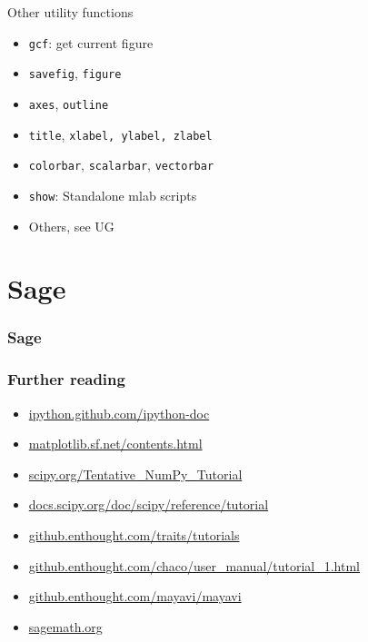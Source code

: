 \documentclass[14pt,compress]{beamer}
\newcounter{time}
\newcommand{\inctime}[1]{\addtocounter{time}{#1}{\tiny \thetime\ m}}
\newcommand{\PythonCode}[1]{\lstinline{#1}}
\begin{document}
\begin{frame}[plain]
    {Other utility functions}
    \begin{itemize}
        \item \PythonCode{gcf}: get current figure
            \pause
        \item \PythonCode{savefig}, \PythonCode{figure}
            \pause
        \item \PythonCode{axes}, \PythonCode{outline}
            \pause
        \item \PythonCode{title}, \PythonCode{xlabel, ylabel, zlabel}
            \pause
        \item \PythonCode{colorbar}, \PythonCode{scalarbar},
            \PythonCode{vectorbar}
            \pause
        \item \PythonCode{show}: Standalone mlab scripts
            \pause
        \item Others, see UG
    \end{itemize}

\end{frame}

\section{Sage}

\begin{frame}[plain]
    \frametitle{Sage}
  \begin{center}    
  \end{center}
    \inctime{10}
\end{frame}

\begin{frame}
    \frametitle{Further reading}
    \begin{itemize}
        \item \url{ipython.github.com/ipython-doc}
        \item \url{matplotlib.sf.net/contents.html}
        \item \url{scipy.org/Tentative_NumPy_Tutorial}
        \item \url{docs.scipy.org/doc/scipy/reference/tutorial}
        \item \url{github.enthought.com/traits/tutorials}
        \item
            \url{github.enthought.com/chaco/user_manual/tutorial_1.html}
        \item \url{github.enthought.com/mayavi/mayavi}
        \item \url{sagemath.org}
    \end{itemize}
\end{frame}
\end{document}
